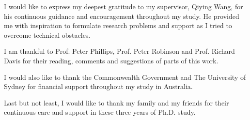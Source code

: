 

\begin{acknowledgements}      %

I would like to express my deepest gratitude to my supervisor, Qiying Wang, for his continuous guidance and encouragement throughout my study. He provided me with inspiration to formulate research problems and support as I tried to overcome technical obstacles.

I am thankful to Prof. Peter Phillips, Prof. Peter Robinson and Prof. Richard Davis for their reading, comments and suggestions of parts of this work.

I would also like to thank the Commonwealth Government and The University of Sydney for financial support throughout my study in Australia.

Last but not least, I would like to thank my family and my friends for their continuous care and support in these three years of Ph.D. study.



\end{acknowledgements}


